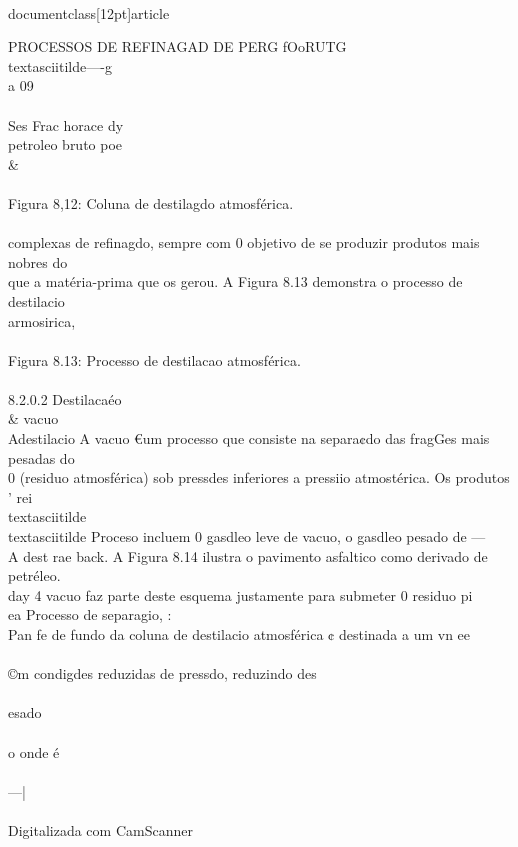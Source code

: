 \\documentclass[12pt]{article}
\begin{document}
{PROCESSOS DE REFINAGAD DE PERG fOoRUTG \\textasciitilde{}—-g\\
a 09\\
\\
Ses Frac horace dy\\
petroleo bruto poe \\&\\
\\
Figura 8,12: Coluna de destilagdo atmosférica.\\
\\
complexas de refinagdo, sempre com 0 objetivo de se produzir produtos mais nobres do\\
que a matéria-prima que os gerou. A Figura 8.13 demonstra o processo de destilacio\\
armosirica,\\
\\
Figura 8.13: Processo de destilacao atmosférica.\\
\\
8.2.0.2 Destilacaéo \\& vacuo\\
Adestilacio A vacuo €um processo que consiste na separa¢do das fragGes mais pesadas do\\
0 (residuo atmosférica) sob pressdes inferiores a pressiio atmostérica. Os produtos\\
' rei \\textasciitilde{}\\textasciitilde{} Proceso incluem 0 gasdleo leve de vacuo, o gasdleo pesado de —\\
A dest rae back. A Figura 8.14 ilustra o pavimento asfaltico como derivado de petréleo.\\
day 4 vacuo faz parte deste esquema justamente para submeter 0 residuo pi\\
ea Processo de separagio, :\\
Pan fe de fundo da coluna de destilacio atmosférica ¢ destinada a um vn ee\\
\\
©m condigdes reduzidas de pressdo, reduzindo des\\
\\
esado\\
\\
o onde é\\
\\
—|\\
\\
Digitalizada com CamScanner\\

}
\end{document}
